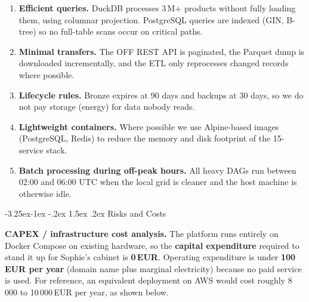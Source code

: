 \documentclass[a4paper,11pt,oneside,openany]{report}
\makeatletter
\renewcommand\subsubsection{\@startsection{subsubsection}{3}{\z@}%
  {-3.25ex\@plus -1ex \@minus -.2ex}%
  {1.5ex \@plus .2ex}%
  {\normalfont\normalsize\bfseries\color{ntblue}}}
\makeatother
\begin{document}
\begin{enumerate}[nosep]
  \item \textbf{Efficient queries.} DuckDB processes 3\,M+
        products without fully loading them, using columnar
        projection. PostgreSQL queries are indexed (GIN, B-tree)
        so no full-table scans occur on critical paths.
  \item \textbf{Minimal transfers.} The OFF REST API is paginated,
        the Parquet dump is downloaded incrementally, and the ETL
        only reprocesses changed records where possible.
  \item \textbf{Lifecycle rules.} Bronze expires at 90 days and
        backups at 30 days, so we do not pay storage (energy) for
        data nobody reads.
  \item \textbf{Lightweight containers.} Where possible we use
        Alpine-based images (PostgreSQL, Redis) to reduce the
        memory and disk footprint of the 15-service stack.
  \item \textbf{Batch processing during off-peak hours.} All
        heavy DAGs run between 02:00 and 06:00 UTC when the local
        grid is cleaner and the host machine is otherwise idle.
\end{enumerate}

\subsubsection{Risks and Costs}
\label{sec:capex}

\textbf{CAPEX / infrastructure cost analysis.} The platform runs
entirely on Docker Compose on existing hardware, so the
\textbf{capital expenditure} required to stand it up for Sophie's
cabinet is \textbf{0\,EUR}. Operating expenditure is under
\textbf{100\,EUR per year} (domain name plus marginal electricity)
because no paid service is used. For reference, an equivalent
deployment on AWS would cost roughly 8\,000 to 10\,000\,EUR per
year, as shown below.
\end{document}
